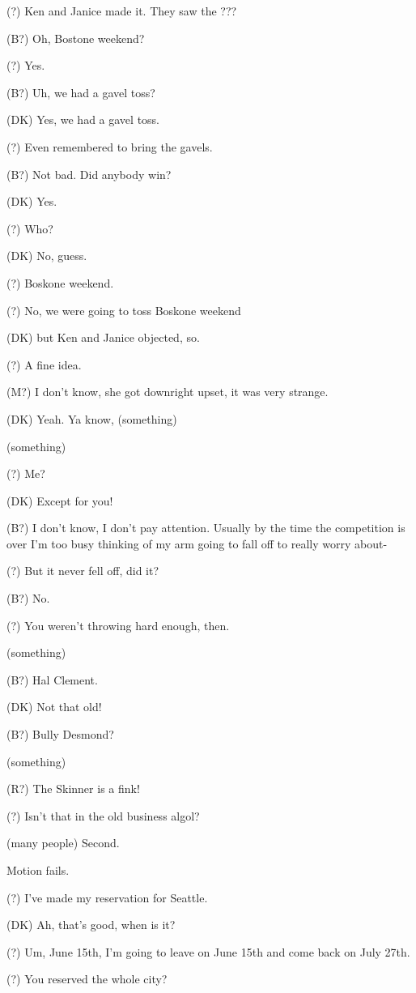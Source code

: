 (?) Ken and Janice made it.  They saw the ???

(B?) Oh, Bostone weekend?

(?) Yes.

(B?) Uh, we had a gavel toss?

(DK) Yes, we had a gavel toss.

(?) Even remembered to bring the gavels.

(B?) Not bad.  Did anybody win?

(DK) Yes.

(?) Who?

(DK) No, guess.

(?) Boskone weekend.

(?) No, we were going to toss Boskone weekend

(DK) but Ken and Janice objected, so.

(?) A fine idea.

(M?) I don't know, she got downright upset, it was very strange.

(DK) Yeah.  Ya know, (something)

(something)

(?) Me?

(DK) Except for you!

(B?) I don't know, I don't pay attention.  Usually by the time the
competition is over I'm too busy thinking of my arm going to fall off
to really worry about-

(?) But it never fell off, did it?

(B?) No.

(?) You weren't throwing hard enough, then.

(something)

(B?) Hal Clement.

(DK) Not that old!

(B?) Bully Desmond?

(something)

(R?) The Skinner is a fink!

(?) Isn't that in the old business algol?

(many people) Second.

Motion fails.

(?) I've made my reservation for Seattle.

(DK) Ah, that's good, when is it?

(?) Um, June 15th, I'm going to leave on June 15th and come back on July
27th.

(?) You reserved the whole city?


